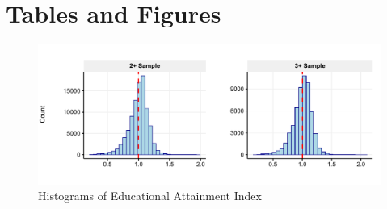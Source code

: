 \documentclass[11pt,a4paper]{article}
\begin{document}


\begin{onehalfspace}
%


\pagebreak


%

\tableofcontents
\pagebreak

\listoffigures

\listoftables
\pagebreak






\printbibliography

\end{onehalfspace}

\newpage
\section*{Tables and Figures}

\begin{figure}[h!]
\centering
\caption{\label{fig:01}Histograms of Educational Attainment Index}
\includegraphics[width=\textwidth]{figures/hists.pdf}
\end{figure}
\end{document}
